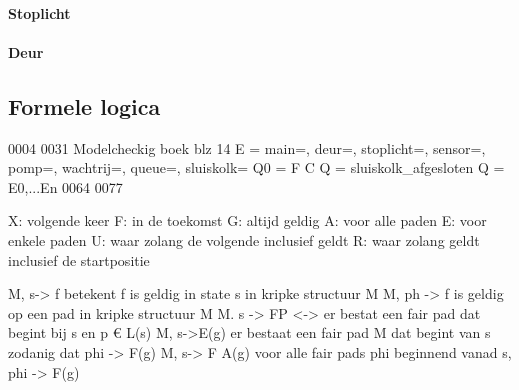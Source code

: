 \paragraph{Stoplicht}

\paragraph{Deur}






	
\subsection{Formele logica}

0004
0031
Modelcheckig boek blz 14
E = {main={},
	deur={},
	stoplicht={},
	sensor={},
	pomp={},
	wachtrij={},
	queue={},
	sluiskolk={}
}
Q0 =
F C Q = sluiskolk_afgesloten
Q = E0,...En
0064
0077



X: volgende keer
F: in de toekomst
G: altijd geldig
A: voor alle paden
E: voor enkele paden
U: waar zolang de volgende inclusief geldt
R: waar zolang geldt inclusief de startpositie

M, s-> f betekent f is geldig in state s in kripke structuur M
M, ph -> f is geldig op een pad in kripke structuur M
M. s -> FP <-> er bestat een fair pad dat begint bij s en p € L(s)
M, s->E(g) er bestaat een fair pad M dat begint van s zodanig dat phi -> F(g)
M, s-> F A(g) voor alle fair pads phi beginnend vanad s,  phi -> F(g)






 
 





